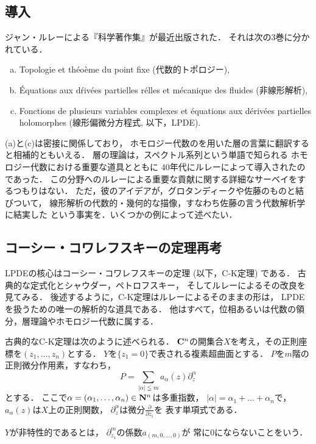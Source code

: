 \subsection{導入}
ジャン・ルレーによる『科学著作集』が最近出版された．
それは次の3巻に分かれている．
\begin{enumerate}[(a)]
    \item Topologie et th\'eo\`eme du point fixe (代数的トポロジー),
    \item \'Equations aux d\'riv\'ees partielles r\'elles et m\'ecanique des fluides (非線形解析),
    \item Fonctions de plusieurs variables complexes et 
    \'equations aux d\'eriv\'ees partielles holomorphes (線形偏微分方程式, 以下，LPDE).
\end{enumerate}

(a)と(c)は密接に関係しており，
ホモロジー代数のを用いた層の言葉に翻訳すると相補的ともいえる．
層の理論は，スペクトル系列という単語で知られる
ホモロジー代数における重要な道具とともに
40年代にルレーによって導入されたのであった．
この分野へのルレーによる重要な貢献に関する詳細なサーベイをするつもりはない．
ただ，彼のアイデアが，グロタンディークや佐藤のものと結びついて，
線形解析の代数的・幾何的な描像，すなわち佐藤の言う代数解析学に結実した
という事実を．いくつかの例によって述べたい．
\subsection{コーシー・コワレフスキーの定理再考}

LPDEの核心はコーシー・コワレフスキーの定理 (以下，C-K定理) である．
古典的な定式化とシャウダー，ペトロフスキー，
そしてルレーによるその改良を見てみる．
後述するように，C-K定理はルレーによるそのままの形は，
LPDEを扱うための唯一の解析的な道具である．
他はすべて，位相あるいは代数の領分，層理論やホモロジー代数に属する．

古典的なC-K定理は次のように述べられる．
\(\mathbf{C}^n\)の開集合\(X\)を考え，その正則座標を\((z_1,\dots,z_n)\)とする．
\(Y\)を\(\{z_1=0\}\)で表される複素超曲面とする．
\(P\)を\(m\)階の正則微分作用素，すなわち，
\[
    P=\sum_{\lvert \alpha\rvert\leqq m}
    a_\alpha(z)\partial_z^\alpha
\]
とする．
ここで\(\alpha=(\alpha_1,\dots,\alpha_n)\in\mathbf{N}^n\)は多重指数，
\(\lvert \alpha\rvert=\alpha_1+\dots+\alpha_n\)で，
\(a_\alpha(z)\)は\(X\)上の正則関数，
\(\partial_z^\alpha\)は微分\(\frac{\partial}{\partial z_i}\)を
表す単項式である．

\(Y\)が非特性的であるとは，
\(\partial_{z_1}^m\)の係数\(a_{(m,0,\dots,0)}\)が
常に0にならないことをいう．

